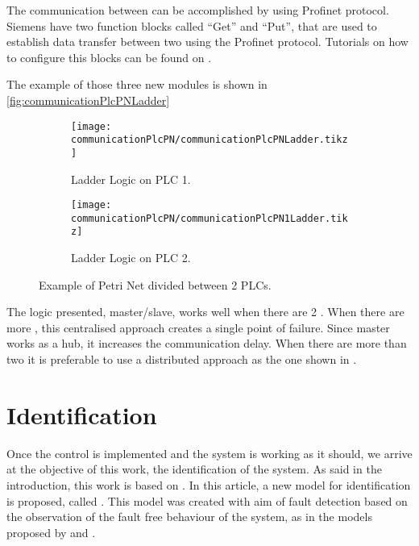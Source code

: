 The communication between \PLCs{} can be accomplished by using Profinet
protocol. Siemens \PLCs{} have two function blocks called ``Get'' and
``Put'', that are used to establish data transfer between two \PLCs{} using the
Profinet protocol. Tutorials on how to configure this blocks can be found on \citep{antunesfloriano2019sincronizacao,oliveira2016protocolo,rochapereira2019automacao}.

The example of those three new modules is shown in \autoref{fig:communicationPlcPNLadder}

\begin{figure}[H]
  \centering
  \begin{subfigure}[t]{0.45\textwidth}
    \centering
    \texttt{[image: communicationPlcPN/communicationPlcPNLadder.tikz]}
    \caption{Ladder Logic on PLC 1.}
    \label{fig:communicationPlcPN1Ladder}
  \end{subfigure}%
  \hfill
  \begin{subfigure}[t]{0.45\textwidth}
    \centering
    \texttt{[image: communicationPlcPN/communicationPlcPN1Ladder.tikz]}
    \caption{Ladder Logic on PLC 2.}
    \label{fig:communicationPlcPN2Ladder}
  \end{subfigure}
  \caption{Example of Petri Net divided between 2 PLCs.}
  \label{fig:communicationPlcPNLadder}
\end{figure}



The logic presented, master\slash slave, works well when
there are 2 \PLCs. When there are more \PLCs, this centralised approach
creates a single point of failure. Since master \PLC{} works as a hub, it
increases the communication delay. When there are more than two \PLCs{} it is
preferable to use a distributed approach as the one shown in
\cite{antunesfloriano2019sincronizacao}.

\section{Identification}
\label{sec:identification}

Once the control is implemented and the system is working as it should, we
arrive at the objective of this work, the identification of the system.
As said in the introduction, this work is based on \cite{moreira2018enhanced}.
In this article, a new model for \DES{} identification is proposed, called
\DAOCT. This model was created with aim of fault detection based
on the observation of the fault free behaviour of the system, as in the models
proposed by 
\cite{roth2009fdi} and \cite{klein2005fault}.

